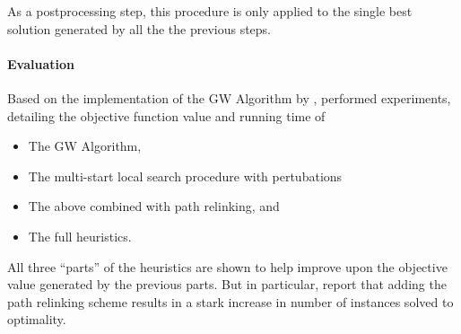  As a postprocessing step, this procedure is only applied to the single best solution generated
  by all the the previous steps.
\paragraph{Evaluation}
Based on the implementation of the GW Algorithm by \citet{Johnson:2000:PCS:338219.338637},
\citet{canuto2001local} performed experiments, detailing the objective function value
and running time of
\begin{itemize}
\item The GW Algorithm,
\item The multi-start local search procedure with pertubations
\item The above combined with path relinking, and
\item The full heuristics.
\end{itemize}

All three ``parts'' of the heuristics are shown to help improve upon the
objective value generated by the previous parts.
But in particular, \citeauthor{canuto2001local} report that adding the
path relinking scheme results in a stark increase
 in number of instances solved to optimality.

